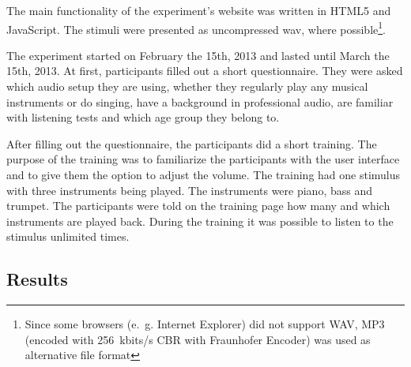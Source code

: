 \par
The main functionality of the experiment's website was written in HTML5 and JavaScript. The stimuli were presented as uncompressed wav, where possible\footnote{Since some browsers (e.~g. Internet Explorer) did not support WAV, MP3 (encoded with \SI{256}{kbits/s} CBR with Fraunhofer Encoder) was used as alternative file format}.
\par
The experiment started on February the 15th, 2013 and lasted until March the 15th, 2013.
At first, participants filled out a short questionnaire. They were asked which audio setup they are using, whether they regularly play any musical instruments or do singing, have a background in professional audio, are familiar with listening tests and which age group they belong to.
\par
After filling out the questionnaire, the participants did a short training. The purpose of the training was to familiarize the participants with the user interface and to give them the option to adjust the volume. The training had one stimulus with three instruments being played. The instruments were piano, bass and trumpet. The participants were told on the training page how many and which instruments are played back. During the training it was possible to listen to the stimulus unlimited times.

\subsection{Results}\label{sec:results}

